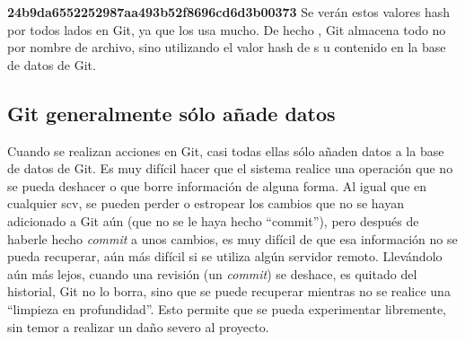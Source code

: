 \documentclass[12pt, spanish, oneside, onecolumn, a4paper]{report}
\begin{document}
\textbf{24b9da6552252987aa493b52f8696cd6d3b00373} Se verán estos valores hash por todos lados en Git, ya que los usa mucho. De hecho , Git almacena todo no por nombre de archivo, sino utilizando el valor hash de s u contenido en la base de datos de Git.

\subsection{Git generalmente sólo añade datos} 
\label{sec:Gitonlyaddsdata}

Cuando se realizan acciones en Git, casi todas ellas sólo añaden datos a la base de datos de Git. Es muy difícil hacer que el sistema realice una operación que no se pueda deshacer o que borre información de alguna forma. Al igual que en cualquier 
\gls{scv}, se pueden perder o estropear los cambios que no se hayan adicionado a Git aún (que no se le haya hecho ``commit''), pero después de haberle hecho \emph{commit} a unos cambios, es muy difícil de que esa información no se pueda recuperar, aún más difícil si se utiliza algún servidor remoto. Llevándolo aún más lejos, cuando una revisión (un \emph{commit}) se deshace, es quitado del historial, Git no lo borra, sino que se puede recuperar mientras no se realice una ``limpieza en profundidad''. Esto permite que se pueda experimentar libremente, sin temor a realizar un daño severo al proyecto. 
\end{document}
